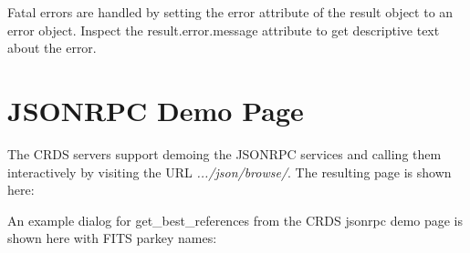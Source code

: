 \documentclass[letterpaper,10pt,english]{sphinxmanual}
\begin{document}
Fatal errors are handled by setting the error attribute of the result object to
an error object.   Inspect the result.error.message attribute to get descriptive
text about the error.


\section{JSONRPC Demo Page}
\label{web_services:jsonrpc-demo-page}
The CRDS servers support demoing the JSONRPC services and calling them interactively
by visiting the URL \emph{.../json/browse/}.    The resulting page is shown here:
\begin{figure}[htbp]
\centering

\end{figure}

An example dialog for get\_best\_references from the CRDS jsonrpc demo page is
shown here with FITS parkey names:
\end{document}
